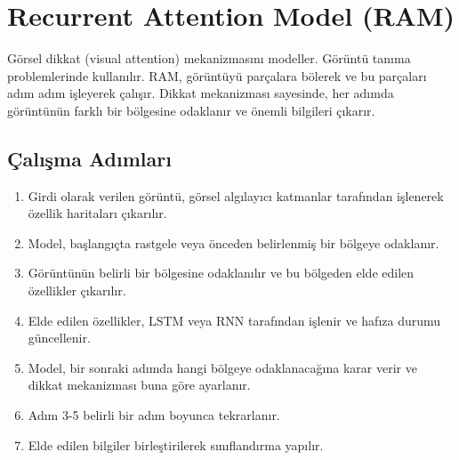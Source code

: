\section{Recurrent Attention Model (RAM)}
Görsel dikkat (visual attention) mekanizmasını modeller. Görüntü tanıma problemlerinde kullanılır. RAM, görüntüyü parçalara bölerek ve bu parçaları adım adım işleyerek çalışır. Dikkat mekanizması sayesinde, her adımda görüntünün farklı bir bölgesine odaklanır ve önemli bilgileri çıkarır. 

\subsection{Çalışma Adımları}
\begin{enumerate}
	\item Girdi olarak verilen görüntü, görsel algılayıcı katmanlar tarafından işlenerek özellik haritaları çıkarılır.
	\item Model, başlangıçta rastgele veya önceden belirlenmiş bir bölgeye odaklanır.
	\item Görüntünün belirli bir bölgesine odaklanılır ve bu bölgeden elde edilen özellikler çıkarılır.
	\item Elde edilen özellikler, LSTM veya RNN tarafından işlenir ve hafıza durumu güncellenir.
	\item Model, bir sonraki adımda hangi bölgeye  odaklanacağına karar verir ve dikkat mekanizması buna göre ayarlanır.
	\item Adım 3-5 belirli bir adım boyunca tekrarlanır.
	\item Elde edilen bilgiler birleştirilerek sınıflandırma yapılır.
\end{enumerate}

\newpage